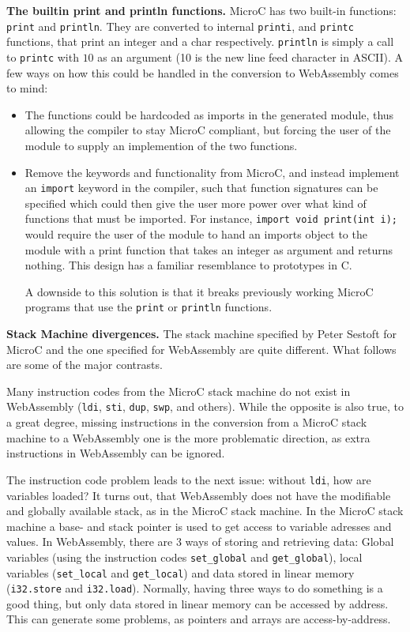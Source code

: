 \documentclass[a4paper]{article}
\begin{document}
\noindent \textbf{The builtin print and println functions.} MicroC has two built-in functions: \texttt{print} and \texttt{println}. They are converted to internal \texttt{printi}, and \texttt{printc} functions, that print an integer and a char respectively. \texttt{println} is simply a call to \texttt{printc} with $10$ as an argument (10 is the new line feed character in ASCII). A few ways on how this could be handled in the conversion to WebAssembly comes to mind:
\begin{itemize}
	\item The functions could be hardcoded as imports in the generated module, thus allowing the compiler to stay MicroC compliant, but forcing the user of the module to supply an implemention of the two functions.
	\item Remove the keywords and functionality from MicroC, and instead implement an \texttt{import} keyword in the compiler, such that function signatures can be specified which could then give the user more power over what kind of functions that must be imported. For instance, \texttt{import void print(int i);} would require the user of the module to hand an imports object to the module with a print function that takes an integer as argument and returns nothing. This design has a familiar resemblance to prototypes in C.

	A downside to this solution is that it breaks previously working MicroC programs that use the \texttt{print} or \texttt{println} functions.
\end{itemize}

\noindent \textbf{Stack Machine divergences.} The stack machine specified by Peter Sestoft for MicroC and the one specified for WebAssembly are quite different. What follows are some of the major contrasts.

Many instruction codes from the MicroC stack machine do not exist in WebAssembly (\texttt{ldi}, \texttt{sti}, \texttt{dup}, \texttt{swp}, and others). While the opposite is also true, to a great degree, missing instructions in the conversion from a MicroC stack machine to a WebAssembly one is the more problematic direction, as extra instructions in WebAssembly can be ignored.

The instruction code problem leads to the next issue: without \texttt{ldi}, how are variables loaded? It turns out, that WebAssembly does not have the modifiable and globally available stack, as in the MicroC stack machine. In the MicroC stack machine a base- and stack pointer is used to get access to variable adresses and values. In WebAssembly, there are 3 ways of storing and retrieving data: Global variables (using the instruction codes \texttt{set\_global} and \texttt{get\_global}), local variables (\texttt{set\_local} and \texttt{get\_local}) and data stored in linear memory (\texttt{i32.store} and \texttt{i32.load}). Normally, having three ways to do something is a good thing, but only data stored in linear memory can be accessed by address. This can generate some problems, as pointers and arrays are access-by-address.
\end{document}

